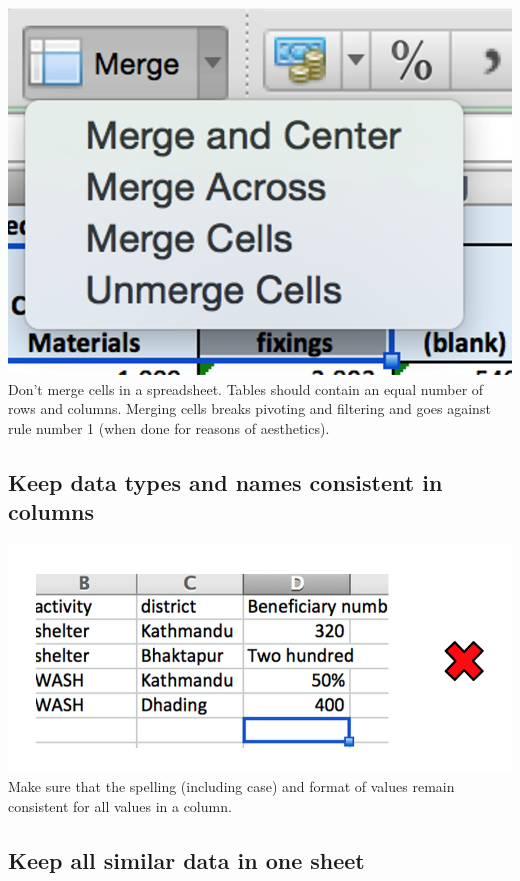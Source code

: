 \documentclass[
  a4paper,
  onecolumn,
  oneside]{book}
\begin{document}
\includegraphics{part1/./images/merge.png}\\
Don't merge cells in a spreadsheet. Tables should contain an equal
number of rows and columns. Merging cells breaks pivoting and filtering
and goes against rule number 1 (when done for reasons of aesthetics).

\hypertarget{keep-data-types-and-names-consistent-in-columns}{%
\subsection{Keep data types and names consistent in
columns}\label{keep-data-types-and-names-consistent-in-columns}}

\includegraphics{part1/./images/names.png}\\
Make sure that the spelling (including case) and format of values remain
consistent for all values in a column.

\hypertarget{keep-all-similar-data-in-one-sheet}{%
\subsection{Keep all similar data in one
sheet}\label{keep-all-similar-data-in-one-sheet}}
\end{document}
